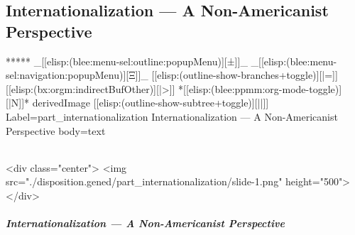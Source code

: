 \begin{whenOrg}
\newpage
\part{Internationalization --- A Non-Americanist Perspective}

\begin{whenOrg}
*****  _[[elisp:(blee:menu-sel:outline:popupMenu)][±]]_ _[[elisp:(blee:menu-sel:navigation:popupMenu)][Ξ]]_ [[elisp:(outline-show-branches+toggle)][|=]] [[elisp:(bx:orgm:indirectBufOther)][|>]] *[[elisp:(blee:ppmm:org-mode-toggle)][|N]]*  derivedImage [[elisp:(outline-show-subtree+toggle)][||]] Label=part_internationalization Internationalization --- A Non-Americanist Perspective body=text
\end{whenOrg}

\begin{htmlonly}

\begin{frame}[fragile,plain,label=part_internationalization]
    \frametitle{}
    \framesubtitle{}
    \begin{rawhtml}
<div class="center">
<img src="./disposition.gened/part_internationalization/slide-1.png" height="500">
</div>
    \end{rawhtml}
\end{frame}
\end{htmlonly}

\begin{verblatex}

\begin{frame}[fragile,label=part_internationalization]
    \frametitle{Internationalization --- A Non-Americanist Perspective}
    \framesubtitle{}

    \tableofcontents

\end{frame}
\end{verblatex}




\end{whenOrg}
